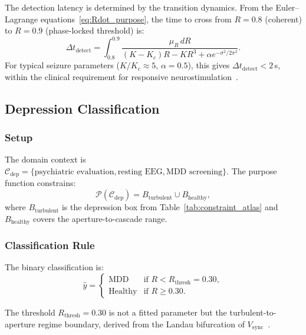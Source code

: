 \documentclass[aps,prd,twocolumn,superscriptaddress,floatfix,nofootinbib]{revtex4-2}
\theoremstyle{remark}
\newcommand{\Kc}{K_c}
\newcommand{\Purpose}{\mathcal{P}}
\newcommand{\Context}{\mathcal{C}}
\begin{document}
The detection latency is determined by the transition dynamics.
From the Euler--Lagrange equations~\eqref{eq:Rdot_purpose}, the time to cross from $R = 0.8$ (coherent) to $R = 0.9$ (phase-locked threshold) is:
\begin{equation}
\Delta t_{\mathrm{detect}} = \int_{0.8}^{0.9} \frac{\mu_R\,dR}{(K - \Kc)R - KR^3 + \alpha e^{-\sigma^2/2\pi^2}}.
\label{eq:latency}
\end{equation}
For typical seizure parameters ($K/\Kc \approx 5$, $\alpha = 0.5$), this gives $\Delta t_{\mathrm{detect}} < 2$\,s, within the clinical requirement for responsive neurostimulation~\cite{morrell2011responsive}.

\subsection{Depression Classification}

\subsubsection{Setup}

The domain context is $\Context_{\mathrm{dep}} = \{\text{psychiatric evaluation}, \text{resting EEG}, \text{MDD screening}\}$.
The purpose function constrains:
\begin{equation}
\Purpose(\Context_{\mathrm{dep}}) = B_{\mathrm{turbulent}} \cup B_{\mathrm{healthy}},
\end{equation}
where $B_{\mathrm{turbulent}}$ is the depression box from Table~\ref{tab:constraint_atlas} and $B_{\mathrm{healthy}}$ covers the aperture-to-cascade range.

\subsubsection{Classification Rule}

The binary classification is:
\begin{equation}
\hat{y} = \begin{cases}
\text{MDD} & \text{if } R < R_{\mathrm{thresh}} = 0.30, \\
\text{Healthy} & \text{if } R \geq 0.30.
\end{cases}
\label{eq:depression_rule}
\end{equation}

The threshold $R_{\mathrm{thresh}} = 0.30$ is not a fitted parameter but the turbulent-to-aperture regime boundary, derived from the Landau bifurcation of $V_{\mathrm{sync}}$~\cite{sachikonye2026lagrangian}.
\end{document}
